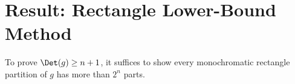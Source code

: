 \chapter{Result: Rectangle Lower-Bound Method}

\begin{theorem}
  \label{thm:rect_lower_bound}
  \leanok
  To prove $\Det(g) \ge n+1$, it suffices to show every monochromatic rectangle
  partition of $g$ has more than $2^n$ parts.
\end{theorem}
